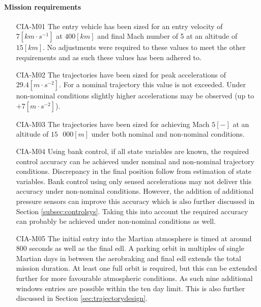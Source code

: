 \paragraph{Mission requirements}
\begin{itemize}[leftmargin=+20mm]
\item[CIA-M01]	The entry vehicle has been sized for an entry velocity of $7 \left[km \cdot s^{-1}\right]$ at $400 \left[km\right]$ and final Mach number of 5 at an altitude of $15 \left[km\right]$. No adjustments were required to these values to meet the other requirements and as such these values has been adhered to. 
\item[CIA-M02]	The trajectories have been sized for peak accelerations of $29.4 \left[m \cdot s^{-2}\right]$. For a nominal trajectory this value is not exceeded. Under non-nominal conditions slightly higher accelerations may be observed (up to $+7 \left[m \cdot s ^{-2}\right]$). 
\item[CIA-M03]  The trajectories have been sized for achieving Mach $5 \left[-\right]$ at an altitude of $15\mbox{ }000 \left[m\right]$ under both nominal and non-nominal conditions.
\item[CIA-M04]	Using bank control, if all state variables are known, the required control accuracy can be achieved under nominal and non-nominal trajectory conditions. Discrepancy in the final position follow from estimation of state variables. Bank control using only sensed accelerations may not deliver this accuracy under non-nominal conditions. However, the addition of additional pressure sensors can improve this accuracy which is also further discussed in Section \ref{subsec:controlsys}. Taking this into account the required accuracy can probably be achieved under non-nominal conditions as well.
\item[CIA-M05] The initial entry into the Martian atmosphere is timed at around $800$ seconds as well as the final \gls{edl}. A parking orbit in multiples of single Martian days in between the aerobraking and final \gls{edl} extends the total mission duration. At least one full orbit is required, but this can be extended further for more favourable atmospheric conditions. As such nine additional windows entries are possible within the ten day limit. This is also further discussed  in Section \ref{sec:trajectorydesign}.

\end{itemize}


